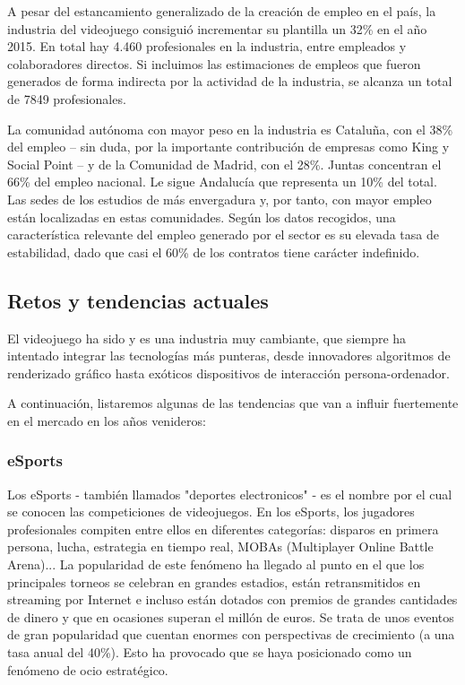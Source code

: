 A pesar del estancamiento generalizado de la creación de empleo en el país, la industria del videojuego consiguió incrementar su plantilla un 32\% en el año 2015. En total hay 4.460 profesionales en la industria, entre empleados y colaboradores directos. Si incluimos las estimaciones de empleos que fueron generados de forma indirecta por la actividad de la industria, se alcanza un total de 7849 profesionales.

La comunidad autónoma con mayor peso en la industria es Cataluña, con el 38\% del empleo – sin duda, por la importante contribución de empresas como King y Social Point – y de la Comunidad de Madrid, con el 28\%. Juntas concentran el 66\% del empleo nacional. Le sigue Andalucía que representa un 10\% del total. Las sedes de los estudios de más envergadura y, por tanto, con mayor empleo están localizadas en estas comunidades. Según los datos recogidos, una característica relevante del empleo generado por el sector es su elevada tasa de estabilidad, dado que casi el 60\% de los contratos tiene carácter indefinido.

\subsection{Retos y tendencias actuales}
El videojuego ha sido y es una industria muy cambiante, que siempre ha intentado integrar las tecnologías más punteras, desde innovadores algoritmos de renderizado gráfico hasta exóticos dispositivos de interacción persona-ordenador.

A continuación, listaremos algunas de las tendencias que van a influir fuertemente en el mercado en los años venideros:

\subsubsection{eSports}
Los eSports - también llamados "deportes electronicos" - es el nombre por el cual se conocen las competiciones de videojuegos. En los eSports, los jugadores profesionales compiten entre ellos en diferentes categorías: disparos en primera persona, lucha, estrategia en tiempo real, MOBAs (Multiplayer Online Battle Arena)... La popularidad de este fenómeno ha llegado al punto en el que los principales torneos se celebran en grandes estadios, están retransmitidos en streaming por Internet e incluso están dotados con premios de grandes cantidades de dinero y que en ocasiones superan el millón de euros. Se trata de unos eventos de gran popularidad que cuentan enormes con perspectivas de crecimiento (a una tasa anual del 40\%). Esto ha provocado que se haya posicionado como un fenómeno de ocio estratégico.

